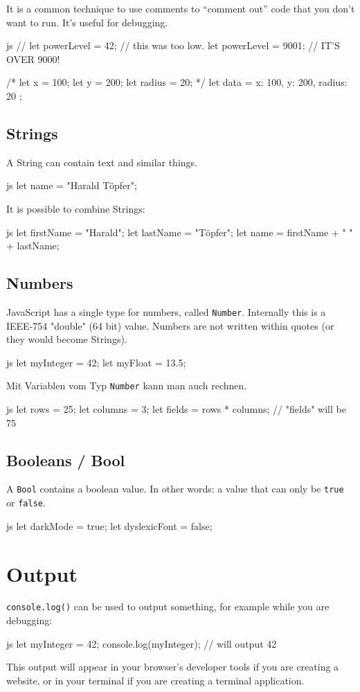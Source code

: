 \documentclass[10pt,a4paper]{article}
\begin{document}
\begin{multicols}{3}
It is a common technique to use comments to \enquote{comment out} code that you don't want to run. It's useful for debugging.
\begin{codebox}{js}{}
  // let powerLevel = 42; // this was too low.
  let powerLevel = 9001; // IT'S OVER 9000!

  /*
  let x = 100;
  let y = 200;
  let radius = 20;
  */
  let data = {
    x: 100,
    y: 200,
    radius: 20
  };
\end{codebox}

\subsection*{Strings}
A String can contain text and similar things.
\begin{codebox}{js}{}
  let name = "Harald Töpfer";
\end{codebox}
It is possible to combine Strings:
\begin{codebox}{js}{}
  let firstName = "Harald";
  let lastName = "Töpfer";
  let name = firstName + " " + lastName;
\end{codebox}

\subsection*{Numbers}
JavaScript has a single type for numbers, called \texttt{Number}. Internally this is a IEEE-754 "double" (64 bit) value. Numbers are not written within quotes (or they would become Strings).

\begin{codebox}{js}{}
  let myInteger = 42;
  let myFloat = 13.5;
\end{codebox}
Mit Variablen vom Typ \texttt{Number} kann man auch rechnen.
\begin{codebox}{js}{}
  let rows = 25;
  let columns = 3;
  let fields = rows * columns; // "fields" will be 75
\end{codebox}

\subsection*{Booleans / Bool}
A \texttt{Bool} contains a boolean value. In other words: a value that can only be \texttt{true} or \texttt{false}.
\begin{codebox}{js}{}
  let darkMode = true;
  let dyslexicFont = false;
\end{codebox}


\section*{Output}
\texttt{console.log()} can be used to output something, for example while you are debugging:
\begin{codebox}{js}{}
let myInteger = 42;
console.log(myInteger); // will output 42
\end{codebox}
This output will appear in your browser's developer tools if you are creating a website, or in your terminal if you are creating a terminal application.



\end{multicols}
\end{document}

